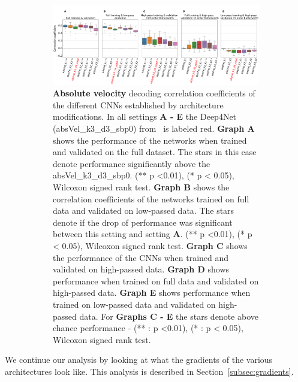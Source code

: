 \begin{itemize}
\begin{figure}
\begin{subfigure}[b]{\textwidth}
   \includegraphics[width=1\linewidth]{img/ch4/original_setting_absVel_performance_comparison}
   \caption{\textbf{Absolute velocity} decoding correlation coefficients of the different CNNs established by architecture modifications. In all settings \textbf{
   A - E} the Deep4Net (absVel\_k3\_d3\_sbp0) from~\cite{Hammer-2021} is labeled red. \textbf{Graph A} shows the performance of the networks when trained and validated on the full dataset. The stars in this case denote performance significantly above the absVel\_k3\_d3\_sbp0. (** p <0.01), (* p < 0.05), Wilcoxon signed rank test.
   \textbf{Graph B} shows the correlation coefficients of the networks trained on full data and validated on low-passed data. 
   The stars denote if the drop of performance was significant between this setting and setting \textbf{A}. (** p <0.01), (* p < 0.05), Wilcoxon signed rank test.
   \textbf{Graph C} shows the performance of the CNNs when trained and validated on high-passed data. \textbf{Graph D} shows performance when trained on full data and validated on high-passed data. \textbf{Graph E} shows performance when trained on low-passed data and validated on high-passed data. For \textbf{Graphs C - E} the stars denote above chance performance - (** : p <0.01), (* : p < 0.05), Wilcoxon signed rank test.}
   \label{fig:original-performances-absolute-velocity}
\end{subfigure}
\caption[Non-shifted causal prediction - performances ]{}
\label{fig:original-performances}
\end{figure}


\end{itemize}

We continue our analysis by looking at what the gradients of the various architectures look like.
This analysis is described in Section~\ref{subsec:gradients}.

